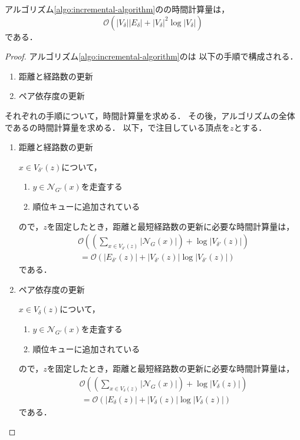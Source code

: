 \begin{lemma}
  アルゴリズム\ref{algo:incremental-algorithm}のの時間計算量は，
  \[ \mathcal{O}(\lvert V_\delta\rvert\lvert E_\delta\rvert
  +\lvert V_\delta\rvert^2\log \lvert V_\delta\rvert) \]
  である．
\end{lemma}
\begin{proof}
  アルゴリズム\ref{algo:incremental-algorithm}のは
  以下の手順で構成される．
  \begin{enumerate}[label=(\alph*)]
  \item 距離と経路数の更新
  \item ペア依存度の更新
  \end{enumerate}
  それぞれの手順について，時間計算量を求める．
  その後，アルゴリズムの全体であるの時間計算量を求める．
  以下，で注目している頂点を$z$とする．

  \begin{enumerate}[label=(\alph*)]
  \item 距離と経路数の更新
    \par $x\in V_{\delta'}(z)$について，
    \begin{enumerate}[label=\arabic*.]
    \item $y\in\mathcal{N}_{G'}(x)$を走査する
    \item 順位キューに追加されている
    \end{enumerate}
    ので，$z$を固定したとき，距離と最短経路数の更新に必要な時間計算量は，
    \begin{equation}
      \begin{aligned}
        &\mathcal{O}(\left(\sum_{x\in V_{\delta'}(z)}\lvert\mathcal{N}_G(x)\rvert\right)
        +\log\lvert V_{\delta'}(z)\rvert) \nonumber\\
        &\:=\mathcal{O}(\lvert E_{\delta'}(z)\rvert
        +\lvert V_{\delta'}(z)\rvert\log\lvert V_{\delta'}(z)\rvert) \nonumber
      \end{aligned}
    \end{equation}
    である．

  \item ペア依存度の更新
    \par $x\in V_\delta(z)$について，
    \begin{enumerate}[label=\arabic*.]
    \item $y\in\mathcal{N}_{G'}(x)$を走査する
    \item 順位キューに追加されている
    \end{enumerate}
    ので，$z$を固定したとき，距離と最短経路数の更新に必要な時間計算量は，
    \begin{equation}
      \begin{aligned}
        &\mathcal{O}(\left(\sum_{x\in V_\delta(z)}\lvert\mathcal{N}_G(x)\rvert\right)
        +\log\lvert V_\delta(z)\rvert) \nonumber\\
        &\:=\mathcal{O}(\lvert E_\delta(z)\rvert
        +\lvert V_\delta(z)\rvert\log\lvert V_\delta(z)\rvert) \nonumber
      \end{aligned}
    \end{equation}
    である．
  \end{enumerate}
  

\end{proof}
